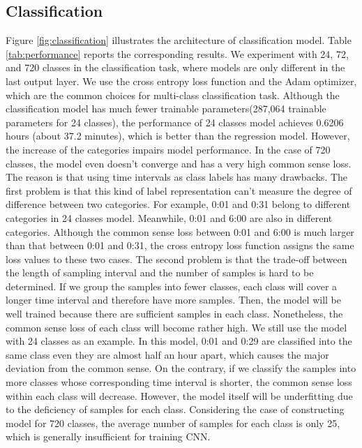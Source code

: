 \documentclass{article}
\begin{document}
\subsection{Classification}
Figure \ref{fig:classification} illustrates the architecture of classification model. Table \ref{tab:performance} reports the corresponding results. We experiment with 24, 72, and 720 classes in the classification task, where models are only different in the last output layer. We use the cross entropy loss function and the Adam optimizer, which are the common choices for multi-class classification task. Although the classification model has much fewer trainable parameters(287,064 trainable parameters for 24 classes), the performance of 24 classes model achieves 0.6206 hours (about 37.2 minutes), which is better than the regression model. However, the increase of the categories impairs model performance. In the case of 720 classes, the model even doesn't converge and has a very high common sense loss. The reason is that using time intervals as class labels has many drawbacks. The first problem is that this kind of label representation can't measure the degree of difference between two categories. For example, 0:01 and 0:31 belong to different categories in 24 classes model. Meanwhile, 0:01 and 6:00 are also in different categories. Although the common sense loss between 0:01 and 6:00 is much larger than that between 0:01 and 0:31, the cross entropy loss function assigns the same loss values to these two cases. The second problem is that the trade-off between the length of sampling interval and the number of samples is hard to be determined. If we group the samples into fewer classes, each class will cover a longer time interval and therefore have more samples. Then, the model will be well trained because there are sufficient samples in each class. Nonetheless, the common sense loss of each class will become rather high. We still use the model with 24 classes as an example. In this model, 0:01 and 0:29 are classified into the same class even they are almost half an hour apart, which causes the major deviation from the common sense. On the contrary, if we classify the samples into more classes whose corresponding time interval is shorter, the common sense loss within each class will decrease. However, the model itself will be underfitting due to the deficiency of samples for each class. Considering the case of constructing model for 720 classes, the average number of samples for each class is only 25, which is generally insufficient for training CNN.
\end{document}
